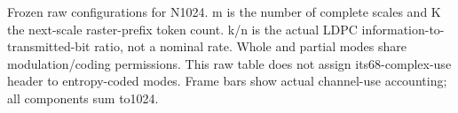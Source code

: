 Frozen raw configurations for N1024. m is the number of complete scales and K the next-scale raster-prefix token count. k/n is the actual LDPC information-to-transmitted-bit ratio, not a nominal rate. Whole and partial modes share modulation/coding permissions. This raw table does not assign its68-complex-use header to entropy-coded modes.
 Frame bars show actual channel-use accounting; all components sum to1024.

